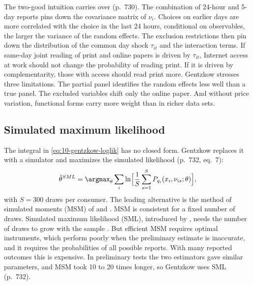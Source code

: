  The two-good intuition carries over (p.~730). The combination of
24-hour and 5-day reports pins down the covariance matrix of $\nu_i$. Choices on earlier days are more correlated with
the choice in the last 24 hours, conditional on observables, the larger the variance of the random effects. The
exclusion restrictions then pin down the distribution of the common day shock $\tau_{it}$ and the interaction terms. If
same-day joint reading of print and online papers is driven by $\tau_{it}$, Internet access at work should not change
the probability of reading print. If it is driven by complementarity, those with access should read print more.
Gentzkow stresses three limitations. The partial panel identifies the random effects less well than a true panel.
The excluded variables shift only the online paper. And without price variation, functional forms carry more weight
than in richer data sets.

\subsection{Simulated maximum likelihood}\label{sec:10-gentzkow-sml}

The integral in \eqref{eq:10-gentzkow-loglik} has no closed form. Gentzkow replaces it with a simulator and maximizes
the simulated likelihood (p.~732, eq.~7):
\begin{equation}\label{eq:10-gentzkow-sml}
  \hat\theta^{SML} = \argmax_\theta \sum_i \ln\Bigl[\frac{1}{S}\sum_{s=1}^{S}P_{q_i}(x_i, \nu_{is}; \theta)\Bigr],
\end{equation}
with $S = 300$ draws per consumer. The leading alternative is the method of simulated moments (MSM) of
\citet{McFadden1989} and \citet{PakesPollard1989}. MSM is consistent for a fixed number of draws. Simulated maximum
likelihood (SML), introduced by \citet{LermanManski1981}, needs the number of draws to grow with the sample
\citep{GourierouxMonfort1996}. But efficient MSM requires optimal instruments, which perform poorly when the
preliminary estimate is inaccurate, and it requires the probabilities of all possible reports. With many reported
outcomes this is expensive. In preliminary tests the two estimators gave similar parameters, and MSM took 10 to 20 times
longer, so Gentzkow uses SML (p.~732).

